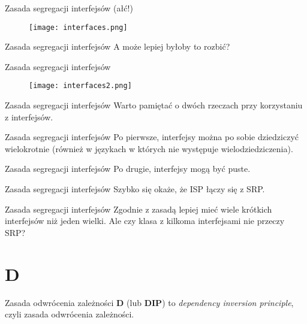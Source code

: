\begin{frame}{Zasada segregacji interfejsów (ałć!)}
	\begin{figure} \centering
		\texttt{[image: interfaces.png]}
	\end{figure}
\end{frame}

\begin{frame}{Zasada segregacji interfejsów}
	A może lepiej byłoby to rozbić?
\end{frame}

\begin{frame}{Zasada segregacji interfejsów}
	\begin{figure} \centering
		\texttt{[image: interfaces2.png]}
	\end{figure}
\end{frame}

\begin{frame}{Zasada segregacji interfejsów}
	Warto pamiętać o dwóch rzeczach przy korzystaniu z interfejsów.
\end{frame}

\begin{frame}{Zasada segregacji interfejsów}
	Po pierwsze, interfejsy można po sobie dziedziczyć wielokrotnie (również w językach w których nie występuje wielodziedziczenia).
\end{frame}

\begin{frame}{Zasada segregacji interfejsów}
	Po drugie, interfejsy mogą być puste.
\end{frame}

\begin{frame}{Zasada segregacji interfejsów}
	Szybko się okaże, że ISP łączy się z SRP. 
\end{frame}

\begin{frame}{Zasada segregacji interfejsów}
	Zgodnie z zasadą lepiej mieć wiele krótkich interfejsów niż jeden wielki. Ale czy klasa z kilkoma interfejsami nie przeczy SRP?
\end{frame}

\section{D}

\begin{frame}{Zasada odwrócenia zależności}
	\textbf{D} (lub \textbf{DIP}) to \emph{dependency inversion principle}, czyli zasada odwrócenia zależności.
\end{frame}

